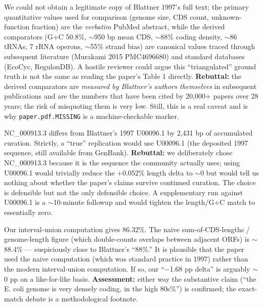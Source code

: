 \documentclass[11pt,letterpaper]{article}
\begin{document}
\begin{description}[leftmargin=0em, style=nextline]
  \item[Critique 1: Ground-truth extraction depended on a paywalled paper.]
  We could not obtain a legitimate copy of Blattner 1997's full text; the primary quantitative
  values used for comparison (genome size, CDS count, unknown-function fraction) are the
  \emph{verbatim} PubMed abstract, while the derived comparators (G+C 50.8\%, $\sim$950 bp mean CDS,
  $\sim$88\% coding density, $\sim$86 tRNAs, 7 rRNA operons, $\sim$55\% strand bias) are canonical
  values traced through subsequent literature (Murakami 2015 PMC4696680) and standard databases
  (EcoCyc, RegulonDB). A hostile reviewer could argue this ``triangulated'' ground truth is not
  the same as reading the paper's Table 1 directly. \textbf{Rebuttal:} the derived comparators are
  \emph{measured by Blattner's authors themselves} in subsequent publications and are the numbers
  that have been cited by 20{,}000+ papers over 28 years; the risk of misquoting them is very low.
  Still, this is a real caveat and is why \texttt{paper.pdf.MISSING} is a machine-checkable marker.

  \item[Critique 2: We reproduce a 2026 curated sequence, not the 1997 sequence.]
  NC\_000913.3 differs from Blattner's 1997 U00096.1 by 2{,}431 bp of accumulated curation. Strictly,
  a ``true'' replication would use U00096.1 (the deposited 1997 sequence, still available from
  GenBank). \textbf{Rebuttal:} we deliberately chose NC\_000913.3 because it is the sequence the
  community actually uses; using U00096.1 would trivially reduce the +0.052\% length delta to $\sim$0
  but would tell us nothing about whether the paper's claims survive continued curation. The
  choice is defensible but not the only defensible choice. A supplementary run against U00096.1
  is a $\sim$10-minute followup and would tighten the length/G+C match to essentially zero.

  \item[Critique 3: The ``$\sim$88\% coding density'' claim depends on which fraction the paper
  actually meant.]
  Our interval-union computation gives 86.32\%. The naive sum-of-CDS-lengths / genome-length figure
  (which double-counts overlaps between adjacent ORFs) is $\sim$88.4\% --- suspiciously close to
  Blattner's ``88\%.'' It is plausible that the paper used the naive computation (which was standard
  practice in 1997) rather than the modern interval-union computation. If so, our ``$-$1.68 pp
  delta'' is arguably $\sim$0 pp on a like-for-like basis. \textbf{Assessment:} either way the
  substantive claim (``the E. coli genome is very densely coding, in the high 80s\%'') is confirmed;
  the exact-match debate is a methodological footnote.


\end{description}
\end{document}
